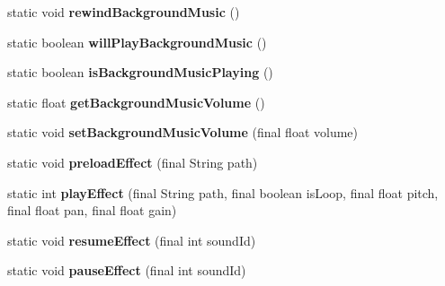 \begin{DoxyCompactItemize}
static void {\bfseries rewind\+Background\+Music} ()
\item 
\mbox{\label{classorg_1_1cocos2dx_1_1lib_1_1Cocos2dxHelper_a3bc31af9a7535436cb42ae162e68baf4}} 
static boolean {\bfseries will\+Play\+Background\+Music} ()
\item 
\mbox{\label{classorg_1_1cocos2dx_1_1lib_1_1Cocos2dxHelper_a16055077d456ccaccbf668f8ac16467c}} 
static boolean {\bfseries is\+Background\+Music\+Playing} ()
\item 
\mbox{\label{classorg_1_1cocos2dx_1_1lib_1_1Cocos2dxHelper_aef64e27ed9bef4b6660bb2ccf96f87c9}} 
static float {\bfseries get\+Background\+Music\+Volume} ()
\item 
\mbox{\label{classorg_1_1cocos2dx_1_1lib_1_1Cocos2dxHelper_a99ef8ee1522a618adfebb052efb83f44}} 
static void {\bfseries set\+Background\+Music\+Volume} (final float volume)
\item 
\mbox{\label{classorg_1_1cocos2dx_1_1lib_1_1Cocos2dxHelper_abc2afb6936f1a948f77645510d7e27e8}} 
static void {\bfseries preload\+Effect} (final String path)
\item 
\mbox{\label{classorg_1_1cocos2dx_1_1lib_1_1Cocos2dxHelper_a74b79a7275290250bba9d2bf5f7cd8fd}} 
static int {\bfseries play\+Effect} (final String path, final boolean is\+Loop, final float pitch, final float pan, final float gain)
\item 
\mbox{\label{classorg_1_1cocos2dx_1_1lib_1_1Cocos2dxHelper_aa5f4901db625d9ecf1b58248a4ef9c61}} 
static void {\bfseries resume\+Effect} (final int sound\+Id)
\item 
\mbox{\label{classorg_1_1cocos2dx_1_1lib_1_1Cocos2dxHelper_abadb775503f30260bcfa37688ac5ac62}} 
static void {\bfseries pause\+Effect} (final int sound\+Id)
\item 
\mbox{\label{classorg_1_1cocos2dx_1_1lib_1_1Cocos2dxHelper_ae2670493c0e34a51dd177ffcd0510b47}} 

\end{DoxyCompactItemize}
